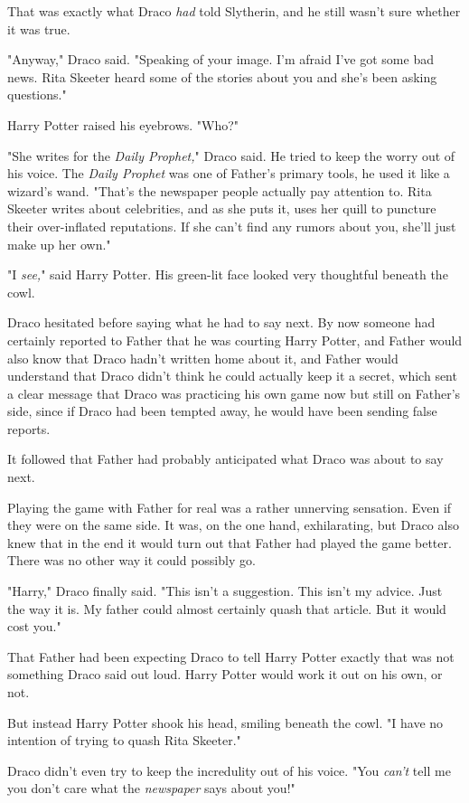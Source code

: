 That was exactly what Draco \emph{had} told Slytherin, and he still wasn't sure
whether it was true.

"Anyway," Draco said. "Speaking of your image. I'm afraid I've got some bad
news. Rita Skeeter heard some of the stories about you and she's been asking
questions."

Harry Potter raised his eyebrows. "Who?"

"She writes for the \emph{Daily Prophet,}" Draco said. He tried to keep the
worry out of his voice. The \emph{Daily Prophet} was one of Father's primary
tools, he used it like a wizard's wand. "That's the newspaper people actually
pay attention to. Rita Skeeter writes about celebrities, and as she puts it,
uses her quill to puncture their over-inflated reputations. If she can't find
any rumors about you, she'll just make up her own."

"I \emph{see,}" said Harry Potter. His green-lit face looked very thoughtful
beneath the cowl.

Draco hesitated before saying what he had to say next. By now someone had
certainly reported to Father that he was courting Harry Potter, and Father
would also know that Draco hadn't written home about it, and Father would
understand that Draco didn't think he could actually keep it a secret, which
sent a clear message that Draco was practicing his own game now but still on
Father's side, since if Draco had been tempted away, he would have been sending
false reports.

It followed that Father had probably anticipated what Draco was about to say
next.

Playing the game with Father for real was a rather unnerving sensation. Even if
they were on the same side. It was, on the one hand, exhilarating, but Draco
also knew that in the end it would turn out that Father had played the game
better. There was no other way it could possibly go.

"Harry," Draco finally said. "This isn't a suggestion. This isn't my advice.
Just the way it is. My father could almost certainly quash that article. But it
would cost you."

That Father had been expecting Draco to tell Harry Potter exactly that was not
something Draco said out loud. Harry Potter would work it out on his own, or
not.

But instead Harry Potter shook his head, smiling beneath the cowl. "I have no
intention of trying to quash Rita Skeeter."

Draco didn't even try to keep the incredulity out of his voice. "You
\emph{can't} tell me you don't care what the \emph{newspaper} says about you!"

